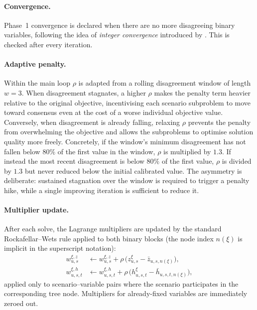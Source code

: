 \documentclass[12pt,a4paper]{article}
\begin{document}
\paragraph{Convergence.}
Phase~1 convergence is declared when there are no more disagreeing binary variables, following the idea of \emph{integer convergence} introduced by \citet{lokketangen1996progressive}.
This is checked after every iteration.

\paragraph{Adaptive penalty.}
Within the main loop $\rho$ is adapted from a rolling disagreement window
of length $w = 3$. When disagreement stagnates, a higher $\rho$ makes the
penalty term heavier relative to the original objective, incentivising each
scenario subproblem to move toward consensus even at the cost of a worse
individual objective value. Conversely, when disagreement is already
falling, relaxing $\rho$ prevents the penalty from overwhelming the
objective and allows the subproblems to optimise solution quality more
freely. Concretely, if the window's minimum disagreement has not fallen
below $80\%$ of the first value in the window, $\rho$ is multiplied by
$1.3$. If instead the most recent disagreement is below $80\%$ of the
first value, $\rho$ is divided by $1.3$ but never reduced below the
initial calibrated value. The asymmetry is deliberate: sustained stagnation over the window is required to trigger a penalty hike, while a single improving iteration is sufficient to reduce it.

\paragraph{Multiplier update.}
After each solve, the Lagrange multipliers are updated by the standard Rockafellar--Wets rule applied to both binary blocks (the node index $n(\xi)$ is implicit in the superscript notation):
\begin{align}
  w^{\xi,z}_{u,s}   &\leftarrow w^{\xi,z}_{u,s}   + \rho\,\big(z^\xi_{u,s} - \bar{z}_{u,s,n(\xi)}\big),\\
  w^{\xi,h}_{u,s,t} &\leftarrow w^{\xi,h}_{u,s,t} + \rho\,\big(h^\xi_{u,s,t} - \bar{h}_{u,s,t,n(\xi)}\big),
\end{align}
applied only to scenario--variable pairs where the scenario participates in the corresponding tree node. Multipliers for already-fixed variables are immediately zeroed out.
\end{document}

